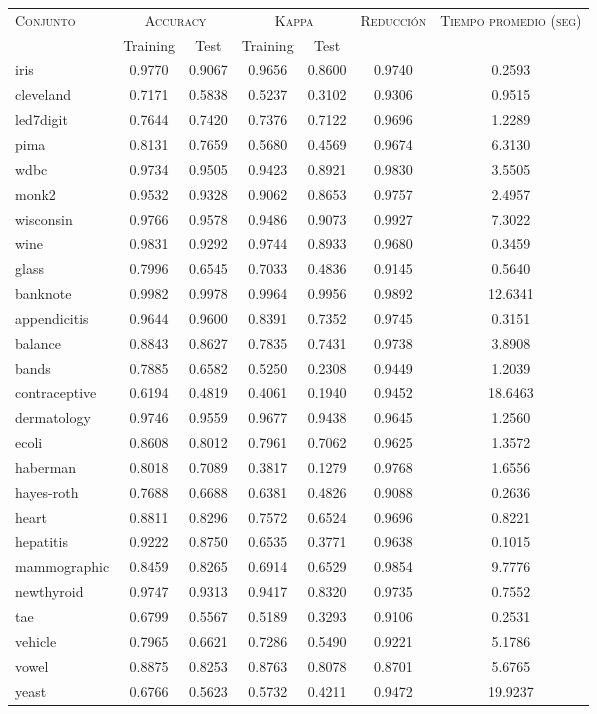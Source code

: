 \begin{table}[]
\centering
\begin{tabular}{l c c c c c c}
\hline
\multirow{2}{*}{\textsc{Conjunto}}
	& \multicolumn{2}{c}{\textsc{Accuracy}}
	& \multicolumn{2}{c}{\textsc{Kappa}}
	& \textsc{Reducción}
	& \textsc{Tiempo promedio (seg)} \\
	& Training & Test
	& Training & Test \\ 
\hline
\hline

iris & 0.9770 & 0.9067 & 0.9656 & 0.8600 & 0.9740 & 0.2593 \\
cleveland & 0.7171 & 0.5838 & 0.5237 & 0.3102 & 0.9306 & 0.9515 \\
led7digit & 0.7644 & 0.7420 & 0.7376 & 0.7122 & 0.9696 & 1.2289 \\
pima & 0.8131 & 0.7659 & 0.5680 & 0.4569 & 0.9674 & 6.3130 \\
wdbc & 0.9734 & 0.9505 & 0.9423 & 0.8921 & 0.9830 & 3.5505 \\
monk2 & 0.9532 & 0.9328 & 0.9062 & 0.8653 & 0.9757 & 2.4957 \\
wisconsin & 0.9766 & 0.9578 & 0.9486 & 0.9073 & 0.9927 & 7.3022 \\
wine & 0.9831 & 0.9292 & 0.9744 & 0.8933 & 0.9680 & 0.3459 \\
glass & 0.7996 & 0.6545 & 0.7033 & 0.4836 & 0.9145 & 0.5640 \\
banknote & 0.9982 & 0.9978 & 0.9964 & 0.9956 & 0.9892 & 12.6341 \\
appendicitis & 0.9644 & 0.9600 & 0.8391 & 0.7352 & 0.9745 & 0.3151 \\
balance & 0.8843 & 0.8627 & 0.7835 & 0.7431 & 0.9738 & 3.8908 \\
bands & 0.7885 & 0.6582 & 0.5250 & 0.2308 & 0.9449 & 1.2039 \\
contraceptive & 0.6194 & 0.4819 & 0.4061 & 0.1940 & 0.9452 & 18.6463 \\
dermatology & 0.9746 & 0.9559 & 0.9677 & 0.9438 & 0.9645 & 1.2560 \\
ecoli & 0.8608 & 0.8012 & 0.7961 & 0.7062 & 0.9625 & 1.3572 \\
haberman & 0.8018 & 0.7089 & 0.3817 & 0.1279 & 0.9768 & 1.6556 \\
hayes-roth & 0.7688 & 0.6688 & 0.6381 & 0.4826 & 0.9088 & 0.2636 \\
heart & 0.8811 & 0.8296 & 0.7572 & 0.6524 & 0.9696 & 0.8221 \\
hepatitis & 0.9222 & 0.8750 & 0.6535 & 0.3771 & 0.9638 & 0.1015 \\
mammographic & 0.8459 & 0.8265 & 0.6914 & 0.6529 & 0.9854 & 9.7776 \\
newthyroid & 0.9747 & 0.9313 & 0.9417 & 0.8320 & 0.9735 & 0.7552 \\
tae & 0.6799 & 0.5567 & 0.5189 & 0.3293 & 0.9106 & 0.2531 \\
vehicle & 0.7965 & 0.6621 & 0.7286 & 0.5490 & 0.9221 & 5.1786 \\
vowel & 0.8875 & 0.8253 & 0.8763 & 0.8078 & 0.8701 & 5.6765 \\
yeast & 0.6766 & 0.5623 & 0.5732 & 0.4211 & 0.9472 & 19.9237 \\


\end{tabular}
\end{table}
